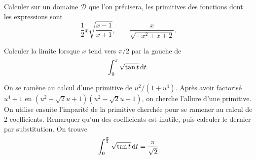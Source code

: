 \documentclass{magnolia}
\begin{document}
Calculer sur un domaine $\mathcal{D}$ que l'on précisera, les primitives des
fonctions dont les expressions sont
\[\frac{1}{2}x\sqrt{\frac{x-1}{x+1}}, \qquad \frac{x}{\sqrt{-x^2+x+2}}.\]








Calculer la limite lorsque $x$ tend vers $\pi/2$ par la gauche de
\[\int_{0}^{x} \sqrt{\tan t}\,\text{d}t.\]
\begin{sol}
On se ramène au calcul d'une primitive de $u^2/(1+u^4)$. Après avoir
factorisé $u^4+1$ en $(u^2+\sqrt{2}u+1)(u^2-\sqrt{2}u+1)$, on cherche
l'allure d'une primitive. On utilise ensuite l'imparité de la primitive
cherchée pour se ramener au calcul de 2 coefficients. Remarquer qu'un des
coefficients est inutile, puis calculer le dernier par substitution. On trouve
\[\int_{0}^{\frac{\pi}{2}} \sqrt{\tan t}\,\text{d}t=\frac{\pi}{\sqrt{2}}\]
\end{sol}
\end{document}
